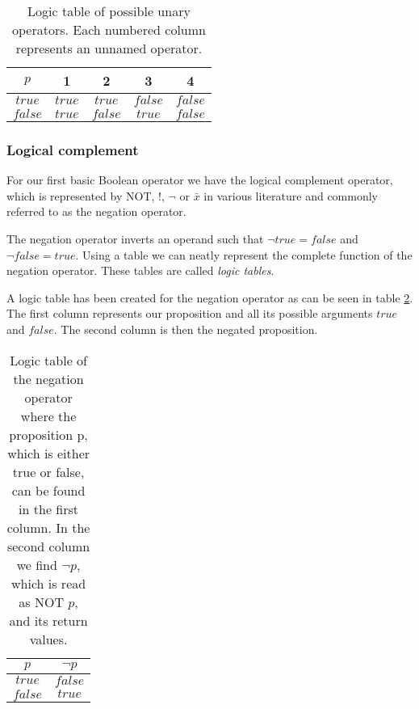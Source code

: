             \begin{table}[h!]
                \centering
                \begin{tabular}{|c||c|c|c|c|}
                	\hline
                	  $p$   &   1    &    2    &    3    & 4       \\ \hline
                	$true$  & $true$ & $true$  & $false$ & $false$ \\ \hline
                	$false$ & $true$ & $false$ & $true$  & $false$ \\ \hline
                \end{tabular}
                \caption{Logic table of possible unary operators. Each numbered column represents an unnamed operator.}
                \label{LogicTable:unary}
            \end{table} 
        
            \subsubsection{Logical complement}
            
                For our first basic Boolean operator we have the logical complement operator, which is represented by NOT, !, $\neg$ or $\bar{x}$ in various literature and commonly referred to as the negation operator. 
                
                The negation operator inverts an operand such that $\neg true = false$ and $\neg false = true$.
                Using a table we can neatly represent the complete function of the negation operator. These tables are called \textit{logic tables}.
                
                A logic table has been created for the negation operator as can be seen in table \ref{LogicTable:Negation}.  The first column represents our proposition and all its possible arguments $true$ and $false$. The second column is then the negated proposition.
                
                \begin{table}[h!]
                    \centering
                    \begin{tabular}{|c|c|}
                    	\hline
                    	  $p$   & $\neg{p}$ \\ \hline
                    	$true$  &  $false$  \\ \hline
                    	$false$ &  $true$   \\ \hline
                    \end{tabular}
                    \caption{Logic table of the negation operator where the proposition p, which is either true or false, can be found in the first column. In the second column we find $\neg p$, which is read as NOT $p$, and its return values.}
                    \label{LogicTable:Negation}
                \end{table}
            
